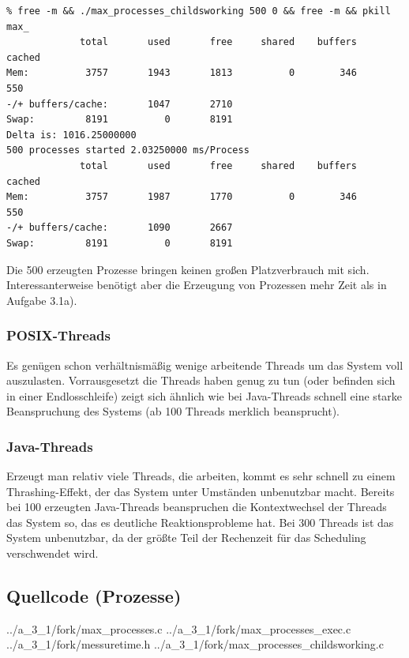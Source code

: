 \documentclass[a4paper,
12pt,
BCOR12mm,
]{scrartcl}
\begin{document}
\begin{verbatim}
% free -m && ./max_processes_childsworking 500 0 && free -m && pkill max_
             total       used       free     shared    buffers     cached
Mem:          3757       1943       1813          0        346        550
-/+ buffers/cache:       1047       2710
Swap:         8191          0       8191
Delta is: 1016.25000000
500 processes started 2.03250000 ms/Process
             total       used       free     shared    buffers     cached
Mem:          3757       1987       1770          0        346        550
-/+ buffers/cache:       1090       2667
Swap:         8191          0       8191
\end{verbatim}
Die 500 erzeugten Prozesse bringen keinen großen Platzverbrauch mit sich.
Interessanterweise benötigt aber die Erzeugung von Prozessen mehr Zeit als in Aufgabe
3.1a).

\subsubsection*{POSIX-Threads}
Es genügen schon verhältnismäßig wenige arbeitende Threads um das System voll auszulasten. Vorrausgesetzt die 
Threads haben genug zu tun (oder befinden sich in einer Endlosschleife) zeigt sich ähnlich wie bei Java-Threads
schnell eine starke Beanspruchung des Systems (ab 100 Threads merklich beansprucht).

\subsubsection*{Java-Threads}
Erzeugt man relativ viele Threads, die arbeiten, kommt es sehr schnell zu einem Thrashing-Effekt, der das System
unter Umständen unbenutzbar macht. Bereits bei 100 erzeugten Java-Threads beanspruchen die Kontextwechsel der Threads
das System so, das es deutliche Reaktionsprobleme hat. Bei 300 Threads ist das System unbenutzbar, da der größte Teil
der Rechenzeit für das Scheduling verschwendet wird.
\subsection*{Quellcode (Prozesse)}
 {../a_3_1/fork/max_processes.c}
 {../a_3_1/fork/max_processes_exec.c}
 {../a_3_1/fork/messuretime.h}
 {../a_3_1/fork/max_processes_childsworking.c}
\end{document}
